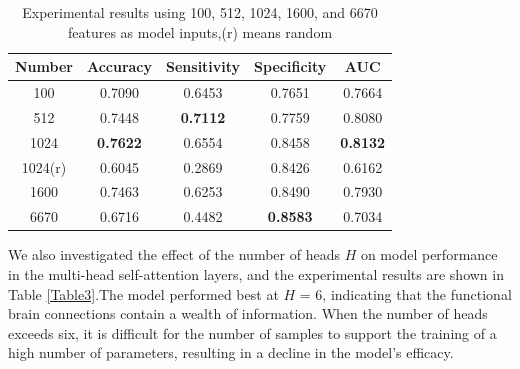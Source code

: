 \documentclass[a4paper]{cas-dc}
\begin{document}
\begin{table}[]
	\caption{Experimental results using 100, 512, 1024, 1600, and 6670 features as model inputs,(r) means random}\label{Table2}
	\begin{tabular*}{\tblwidth}{@{}ccccc@{}}
		\toprule
		\textbf{Number}& \textbf{Accuracy} & \textbf{Sensitivity} & \textbf{Specificity} & \textbf{AUC} \\ %
		\midrule
		100                                     & 0.7090              & 0.6453                & 0.7651                 & 0.7664           \\
		512                                     & 0.7448              & \textbf{0.7112}       & 0.7759                 & 0.8080           \\
		1024                                    & \textbf{0.7622}     & 0.6554                & 0.8458                 & \textbf{0.8132}  \\
		1024(r)                                 & 0.6045              & 0.2869                & 0.8426                 & 0.6162           \\
		1600                                    & 0.7463              & 0.6253                & 0.8490                 & 0.7930           \\
		6670                                    & 0.6716              & 0.4482                & \textbf{0.8583}        & 0.7034 \\
		\bottomrule
	\end{tabular*}
\end{table}
We also investigated the effect of the number of heads $H$ on model performance in the multi-head self-attention layers, and the experimental results are shown in Table \ref{Table3}.The model performed best at $H$ = 6, indicating that the functional brain connections contain a wealth of information. When the number of heads exceeds six, it is difficult for the number of samples to support the training of a high number of parameters, resulting in a decline in the model's efficacy.
\end{document}
